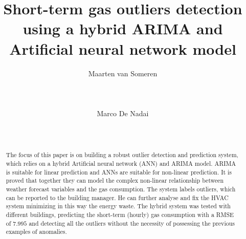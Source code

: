 \documentclass{sig-alternate-sigmod07}
\begin{document}
%
\makeatletter
\def\@copyrightspace{\relax}
\makeatother
\title{Short-term gas outliers detection using a hybrid ARIMA and Artificial neural network model}
%
%
\author{
%
%
\alignauthor
Maarten van Someren\\ %
       \\
       \\
       \\
\alignauthor
Marco De Nadai\\
       \\
      \\
}
\maketitle
\begin{abstract}

The focus of this paper is on building a robust outlier detection and prediction system, which relies on a hybrid Artificial neural network (ANN) and ARIMA model. ARIMA is suitable for linear prediction and ANNs are suitable for non-linear prediction. It is proved that together they can model the complex non-linear relationship between weather forecast variables and the gas consumption. The system labels outliers, which can be reported to the building manager. He can further analyse and fix the HVAC system minimizing in this way the energy waste. 
The hybrid system was tested with different buildings, predicting the short-term (hourly) gas consumption with a RMSE of $7.995$ and detecting all the outliers without the necessity of possessing the previous examples of anomalies.

\end{abstract}
\end{document}
